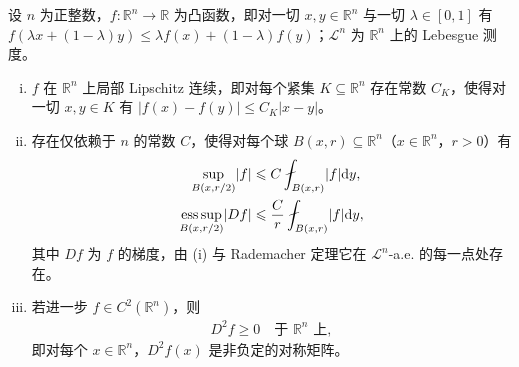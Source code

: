 \documentclass[../../main.tex]{subfiles}%
\begin{document}
\begin{theorem}[凸函数的性质]\label{theorem:ch06-6-7}
设 $n$ 为正整数，$f:\mathbb{R}^n\to\mathbb{R}$ 为凸函数，即对一切 $x,y\in\mathbb{R}^n$ 与一切 $\lambda\in[0,1]$ 有 $f(\lambda x+(1-\lambda)y)\leqslant\lambda f(x)+(1-\lambda)f(y)$；$\mathcal{L}^{n}$ 为 $\mathbb{R}^n$ 上的 Lebesgue 测度。
\begin{enumerate}[(i)]
\item $f$ 在 $\mathbb{R}^n$ 上局部 Lipschitz 连续，即对每个紧集 $K\subseteq\mathbb{R}^n$ 存在常数 $C_K$，使得对一切 $x,y\in K$ 有 $\lvert f(x)-f(y)\rvert\leqslant C_K\lvert x-y\rvert$。
\item 存在仅依赖于 $n$ 的常数 $C$，使得对每个球 $B(x,r)\subseteq\mathbb{R}^n$（$x\in\mathbb{R}^n$，$r>0$）有
\begin{align*}
\sup_{B(x,r/2)}\lvert f\rvert&\leqslant C\fint_{B(x,r)}\lvert f\rvert\diff y,\\
\operatorname*{ess\,sup}_{B(x,r/2)}\lvert Df\rvert&\leqslant\frac{C}{r}\fint_{B(x,r)}\lvert f\rvert\diff y,
\end{align*}
其中 $Df$ 为 $f$ 的梯度，由 (i) 与 Rademacher 定理它在 $\mathcal{L}^{n}$-a.e. 的每一点处存在。
\item 若进一步 $f\in C^{2}(\mathbb{R}^n)$，则
\begin{align*}
D^{2}f\geqslant0\quad\text{于 }\mathbb{R}^n\text{ 上},
\end{align*}
即对每个 $x\in\mathbb{R}^n$，$D^{2}f(x)$ 是非负定的对称矩阵。
\end{enumerate}
\end{theorem}
\end{document}
